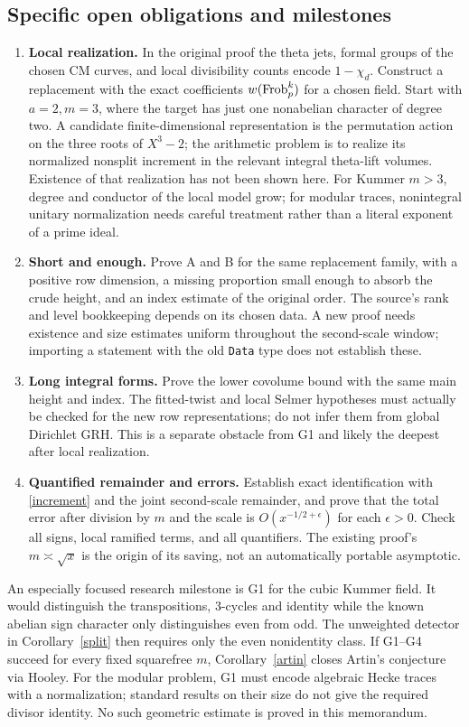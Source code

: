 \documentclass[11pt]{article}
\theoremstyle{definition}\newtheorem{definition}[theorem]{Definition}
\begin{document}
\subsection{Specific open obligations and milestones}
\begin{enumerate}[label=G\arabic*.]
\item \textbf{Local realization.} In the original proof the theta jets, formal groups of the chosen CM curves, and local divisibility counts encode $1-\chi_d$. Construct a replacement with the exact coefficients $w(\operatorname{Frob}_p^k)$ for a chosen field. Start with $a=2,m=3$, where the target has just one nonabelian character of degree two. A candidate finite-dimensional representation is the permutation action on the three roots of $X^3-2$; the arithmetic problem is to realize its normalized nonsplit increment in the relevant integral theta-lift volumes. Existence of that realization has not been shown here. For Kummer $m>3$, degree and conductor of the local model grow; for modular traces, nonintegral unitary normalization needs careful treatment rather than a literal exponent of a prime ideal.
\item \textbf{Short and enough.} Prove A and B for the same replacement family, with a positive row dimension, a missing proportion small enough to absorb the crude height, and an index estimate of the original order. The source's rank and level bookkeeping depends on its chosen data. A new proof needs existence and size estimates uniform throughout the second-scale window; importing a statement with the old \texttt{Data} type does not establish these.
\item \textbf{Long integral forms.} Prove the lower covolume bound with the same main height and index. The fitted-twist and local Selmer hypotheses must actually be checked for the new row representations; do not infer them from global Dirichlet GRH. This is a separate obstacle from G1 and likely the deepest after local realization.
\item \textbf{Quantified remainder and errors.} Establish exact identification with \eqref{increment} and the joint second-scale remainder, and prove that the total error after division by $m$ and the scale is $O(x^{-1/2+\epsilon})$ for each $\epsilon>0$. Check all signs, local ramified terms, and all quantifiers. The existing proof's $m\asymp\sqrt x$ is the origin of its saving, not an automatically portable asymptotic.
\end{enumerate}
An especially focused research milestone is G1 for the cubic Kummer field. It would distinguish the transpositions, 3-cycles and identity while the known abelian sign character only distinguishes even from odd. The unweighted detector in Corollary~\ref{split} then requires only the even nonidentity class. If G1--G4 succeed for every fixed squarefree $m$, Corollary~\ref{artin} closes Artin's conjecture via Hooley. For the modular problem, G1 must encode algebraic Hecke traces with a normalization; standard results on their size do not give the required divisor identity. No such geometric estimate is proved in this memorandum.
\end{document}
